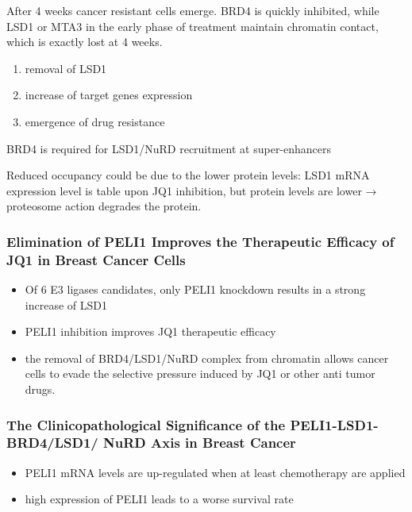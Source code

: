 After 4 weeks cancer resistant cells emerge. BRD4 is quickly inhibited,
while LSD1 or MTA3 in the early phase of treatment maintain chromatin
contact, which is exactly lost at 4 weeks.

\begin{enumerate}
\def\labelenumi{\arabic{enumi}.}
\tightlist
\item
  removal of LSD1
\item
  increase of target genes expression
\item
  emergence of drug resistance
\end{enumerate}

BRD4 is required for LSD1/NuRD recruitment at super-enhancers

Reduced occupancy could be due to the lower protein levels: LSD1 mRNA
expression level is table upon JQ1 inhibition, but protein levels are
lower → proteosome action degrades the protein.

\hypertarget{elimination-of-peli1-improves-the-therapeutic-efficacy-of-jq1-in-breast-cancer-cells}{%
\subsubsection{Elimination of PELI1 Improves the Therapeutic Efficacy of
JQ1 in Breast Cancer
Cells}\label{elimination-of-peli1-improves-the-therapeutic-efficacy-of-jq1-in-breast-cancer-cells}}

\begin{itemize}
\tightlist
\item
  Of 6 E3 ligases candidates, only PELI1 knockdown results in a strong
  increase of LSD1
\item
  PELI1 inhibition improves JQ1 therapeutic efficacy
\item
  the removal of BRD4/LSD1/NuRD complex from chromatin allows cancer
  cells to evade the selective pressure induced by JQ1 or other anti
  tumor drugs.
\end{itemize}

\hypertarget{the-clinicopathological-significance-of-the-peli1-lsd1-brd4lsd1-nurd-axis-in-breast-cancer}{%
\subsubsection{The Clinicopathological Significance of the
PELI1-LSD1-BRD4/LSD1/ NuRD Axis in Breast
Cancer}\label{the-clinicopathological-significance-of-the-peli1-lsd1-brd4lsd1-nurd-axis-in-breast-cancer}}

\begin{itemize}
\tightlist
\item
  PELI1 mRNA levels are up-regulated when at least chemotherapy are
  applied
\item
  high expression of PELI1 leads to a worse survival rate
\end{itemize}

